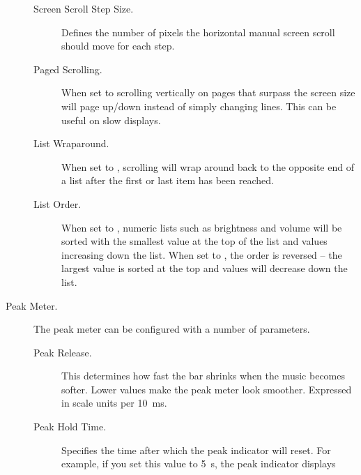 \begin{description}
\begin{description}
    \item[Screen Scroll Step Size.]
      Defines the number of pixels the horizontal manual screen scroll should move
      for each step.
    \item[Paged Scrolling.]
      When set to  scrolling vertically on pages that surpass the
      screen size will page up/down instead of simply changing lines. This can be
      useful on slow displays.
    \item[List Wraparound.]
      When set to , scrolling will wrap around back to the opposite
      end of a list after the first or last item has been reached.
    \item[List Order.]
      When set to , numeric lists such as brightness and
      volume will be sorted with the smallest value at the top of the list and
      values increasing down the list. When set to , the
      order is reversed -- the largest value is sorted at the top and values
      will decrease down the list.
    \end{description}
%
  \item[Peak Meter.]
    The peak meter can be configured with a number of parameters.
    \begin{description}
    \item[Peak Release.]
      This determines how fast the bar shrinks when the music becomes
      softer. Lower values make the peak meter look smoother.
      Expressed in scale units per 10~ms.
    \item[Peak Hold Time.]
      Specifies the time after which the peak indicator will reset.
      For example, if you set this value to 5~s, the peak indicator displays

\end{description}
\end{description}
